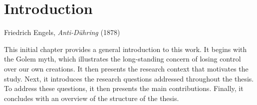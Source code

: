 \chapter{Introduction}
\label{chap:introduction}

{Friedrich Engels, \textit{Anti-Dühring} (1878)~\parencite{engels1878antiduhring}}

\chaptercontents

\glsresetall

This initial chapter provides a general introduction to this work.
It begins with the Golem myth, which illustrates the long-standing concern of losing control over our own creations.
It then presents the research context that motivates the study.
Next, it introduces the research questions addressed throughout the thesis.
To address these questions, it then presents the main contributions.
Finally, it concludes with an overview of the structure of the thesis.






